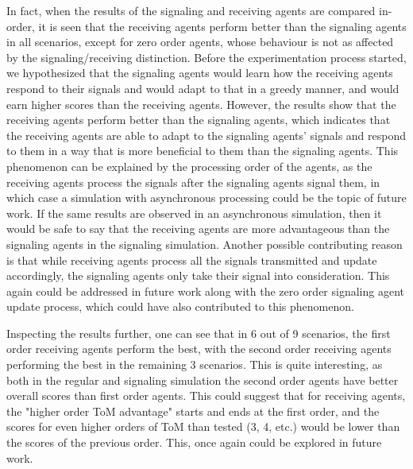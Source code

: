 In fact, when the results of the signaling and receiving agents are compared in-order, it is seen that the receiving agents perform better than the signaling agents in all scenarios, except for zero order agents, whose behaviour is not as affected by the signaling/receiving distinction. Before the experimentation process started, we hypothesized that the signaling agents would learn how the receiving agents respond to their signals and would adapt to that in a greedy manner, and would earn higher scores than the receiving agents. However, the results show that the receiving agents perform better than the signaling agents, which indicates that the receiving agents are able to adapt to the signaling agents' signals and respond to them in a way that is more beneficial to them than the signaling agents. This phenomenon can be explained by the processing order of the agents, as the receiving agents process the signals after the signaling agents signal them, in which case a simulation with asynchronous processing could be the topic of future work. If the same results are observed in an asynchronous simulation, then it would be safe to say that the receiving agents are more advantageous than the signaling agents in the signaling simulation. Another possible contributing reason is that while receiving agents process all the signals transmitted and update accordingly, the signaling agents only take their signal into consideration. This again could be addressed in future work along with the zero order signaling agent update process, which could have also contributed to this phenomenon.

Inspecting the results further, one can see that in 6 out of 9 scenarios, the first order receiving agents perform the best, with the second order receiving agents performing the best in the remaining 3 scenarios. This is quite interesting, as both in the regular and signaling simulation the second order agents have better overall scores than first order agents. This could suggest that for receiving agents, the "higher order ToM advantage" starts and ends at the first order, and the scores for even higher orders of ToM than tested (3, 4, etc.) would be lower than the scores of the previous order. This, once again could be explored in future work.

